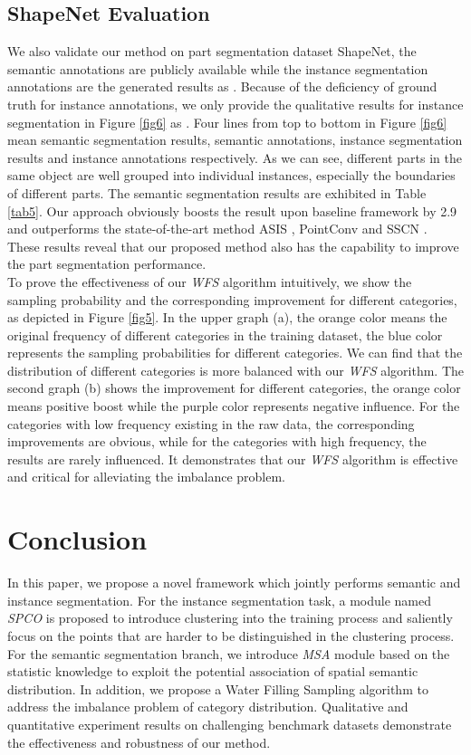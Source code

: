 \documentclass{cta-author}
\begin{document}
\subsection{ShapeNet Evaluation}
We also validate our method on part segmentation dataset ShapeNet, the semantic annotations are publicly available while the instance segmentation annotations are the generated results as \cite{wang2018sgpn}. Because of the deficiency of ground truth for instance annotations, we only provide the qualitative results for instance segmentation in Figure \ref{fig6} as \cite{wang2019associatively}. Four lines from top to bottom in Figure \ref{fig6} mean semantic segmentation results, semantic annotations, instance segmentation results and instance annotations respectively.
As we can see, different parts in the same object are well grouped into individual instances, especially the boundaries of different parts.
The semantic segmentation results are exhibited in Table \ref{tab5}. Our approach obviously boosts the result upon baseline framework by 2.9  and outperforms the state-of-the-art method ASIS \cite{wang2019associatively}, PointConv \cite{wu2019pointconv} and SSCN \cite{graham20183d}.
These results reveal that our proposed method also has the capability to improve the part segmentation performance.\\
To prove the effectiveness of our \textit{WFS} algorithm intuitively, we show the sampling probability and the corresponding improvement for different categories, as depicted in Figure \ref{fig5}. In the upper graph (a), the orange color means the original frequency of different categories in the training dataset, the blue color represents the sampling probabilities for different categories. We can find that the distribution of different categories is more balanced with our \textit{WFS} algorithm. The second graph (b) shows the improvement for different categories, the orange color means positive boost while the purple color represents negative influence. For the categories with low frequency existing in the raw data, the corresponding improvements are obvious, while for the categories with high frequency, the results are rarely influenced. It demonstrates that our \textit{WFS} algorithm is effective and critical for alleviating the imbalance problem.
\section{Conclusion} 
In this paper, we propose a novel framework which jointly performs semantic and instance segmentation. For the instance segmentation task, a module named \textit{SPCO} is proposed to introduce clustering into the training process and saliently focus on the points that are harder to be distinguished in the clustering process. For the semantic segmentation branch, we introduce \textit{MSA} module based on the statistic knowledge to exploit the potential association of spatial semantic distribution. In addition, we propose a Water Filling Sampling algorithm to address the imbalance problem of category distribution. Qualitative and quantitative experiment results on challenging benchmark datasets demonstrate the effectiveness and robustness of our method.
\end{document}
